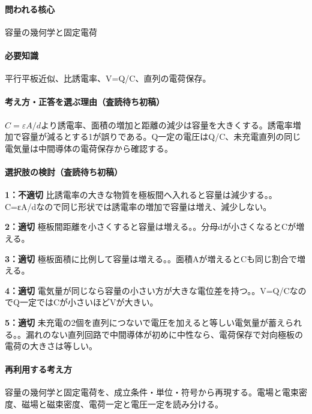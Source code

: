 \paragraph{問われる核心} 容量の幾何学と固定電荷

\paragraph{必要知識} 平行平板近似、比誘電率、V=\allowbreak{}Q/C、直列の電荷保存。

\paragraph{考え方・正答を選ぶ理由（査読待ち初稿）} \(C=\varepsilon A/d\)より誘電率、面積の増加と距離の減少は容量を大きくする。誘電率増加で容量が減るとする1が誤りである。Q一定の電圧はQ/C、未充電直列の同じ電気量は中間導体の電荷保存から確認する。

\paragraph{選択肢の検討（査読待ち初稿）}\mbox{}\par

\noindent\textbf{1：不適切} 比誘電率の大きな物質を極板間へ入れると容量は減少する。。C=εA/dなので同じ形状では誘電率の増加で容量は増え、減少しない。\par

\noindent\textbf{2：適切} 極板間距離を小さくすると容量は増える。。分母dが小さくなるとCが増える。\par

\noindent\textbf{3：適切} 極板面積に比例して容量は増える。。面積Aが増えるとCも同じ割合で増える。\par

\noindent\textbf{4：適切} 電気量が同じなら容量の小さい方が大きな電位差を持つ。。V=\allowbreak{}Q/CなのでQ一定ではCが小さいほどVが大きい。\par

\noindent\textbf{5：適切} 未充電の2個を直列につないで電圧を加えると等しい電気量が蓄えられる。。漏れのない直列回路で中間導体が初めに中性なら、電荷保存で対向極板の電荷の大きさは等しい。\par

\paragraph{再利用する考え方} 容量の幾何学と固定電荷を、成立条件・単位・符号から再現する。電場と電束密度、磁場と磁束密度、電荷一定と電圧一定を読み分ける。

